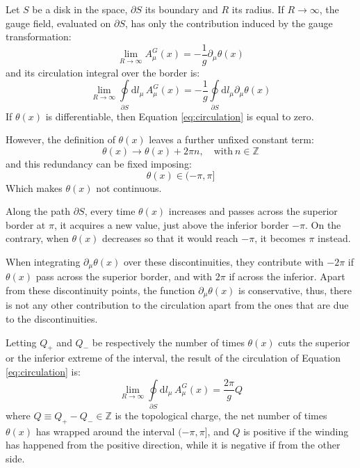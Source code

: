 Let $S$ be a disk in the space, $\partial S$ its boundary and $R$ its radius.
If $R \to \infty$, the gauge field, evaluated on $\partial S$,
has only the contribution induced by the gauge transformation:
\[
    \lim_{R\to\infty}A^G_\mu(x) = -\frac{1}{g}\partial_\mu\theta(x)
\]
and its circulation integral over the border is:
\begin{equation}\label{eq:circlulation}
    \lim_{R\to\infty}\oint\limits_{\partial S}\mathrm dl_\mu\,A^G_\mu(x) = -\frac{1}{g}\oint\limits_{\partial S}\mathrm dl_\mu\partial_\mu\theta(x)
\end{equation}
If $\theta(x)$ is differentiable, then Equation \eqref{eq:circulation} is equal to zero.

However, the definition of $\theta(x)$ leaves a further unfixed constant term:
\[
    \theta(x) \rightarrow \theta(x) + 2\pi n, \quad \text{with}\ n \in \mathbb Z
\]
and this redundancy can be fixed imposing:
\[
    \theta(x) \in (-\pi,\pi]
\]
Which makes $\theta(x)$ not continuous.

Along the path $\partial S$, every time $\theta(x)$ increases and passes across the superior border at $\pi$, it acquires a new value,
just above the inferior border $-\pi$.
On the contrary, when $\theta(x)$ decreases so that it would reach $-\pi$, it becomes $\pi$ instead.

When integrating $\partial_\mu\theta(x)$ over these discontinuities,
they contribute with $-2\pi$ if $\theta(x)$ pass across the superior border, and with $2\pi$ if across the inferior.
Apart from these discontinuity points, the function $\partial_\mu\theta(x)$ is conservative, thus,
there is not any other contribution to the circulation apart from the ones that are due to the discontinuities.

Letting $Q_+$ and $Q_-$ be respectively the number of times $\theta(x)$ cuts the superior or the inferior extreme of the interval,
the result of the circulation of Equation \eqref{eq:circulation} is:
\[
    \lim_{R\to\infty}\oint\limits_{\partial S}\mathrm dl_\mu\,A^G_\mu(x) = \frac{2\pi}{g} Q
\]
where $Q \equiv Q_+ - Q_- \in \mathbb Z$ is the topological charge, \ie the net number of times $\theta(x)$ has wrapped around the interval $(-\pi,\pi]$,
and $Q$ is positive if the winding has happened from the positive direction, while it is negative if from the other side.

